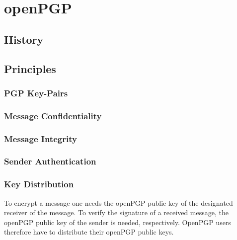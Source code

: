 \chapter{openPGP}


\section{History}

\section{Principles} \label{section:openpgp:principles}


\subsection{PGP Key-Pairs} \label{section:openpgp:keys}

\subsection{Message Confidentiality} \label{section:openpgp:confidentiality}


\subsection{Message Integrity} \label{section:openpgp:integrity}


\subsection{Sender Authentication} \label{section:openpgp:authentication}




\subsection{Key Distribution} \label{section:openpgp:keydistributio}

To encrypt a message one needs the openPGP public key of the designated receiver of the message.
To verify the signature of a received message, the openPGP public key of the sender is needed, respectively.
OpenPGP users therefore have to distribute their openPGP public keys.


